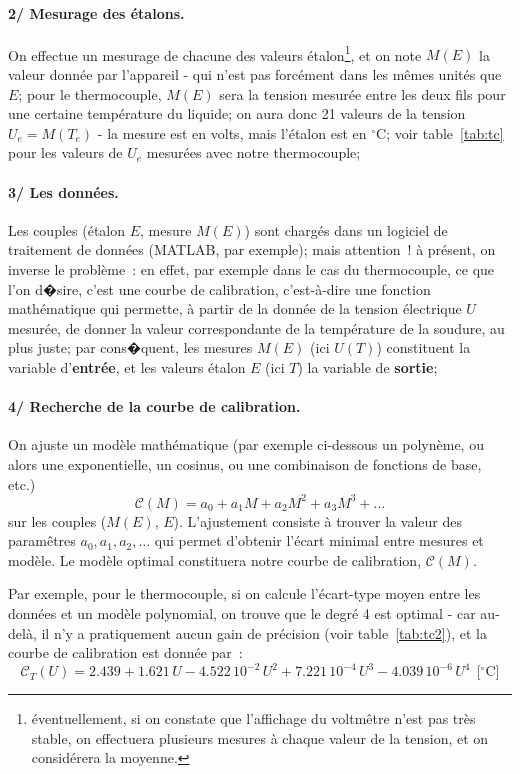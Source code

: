 \paragraph{2/ Mesurage des étalons.} On effectue un mesurage de chacune des valeurs étalon\footnote{éventuellement, si on constate que l'affichage du voltmêtre n'est pas très stable, on effectuera plusieurs mesures à chaque valeur de la tension, et on considérera la moyenne.}, et on note $M(E)$ la valeur donnée par l'appareil - qui n'est pas forcément dans les mêmes unités que $E$; pour le thermocouple, $M(E)$ sera la tension mesurée entre les deux fils pour une certaine température du liquide; on aura donc 21 valeurs de la tension $U_e=M(T_e)$ - la mesure est en volts, mais l'étalon est en $^\circ$C; voir table~\ref{tab:tc} pour les valeurs de $U_e$ mesurées avec notre thermocouple;

\paragraph{3/ Les données.} Les couples (étalon $E$, mesure $M(E)$) sont chargés dans un logiciel de traitement de données (MATLAB, par exemple); mais attention~! à présent, on inverse le problème~: en effet, par exemple dans le cas du thermocouple, ce que l'on d�sire, c'est une courbe de calibration, c'est-à-dire une fonction mathématique qui permette, à partir de la donnée de la tension électrique $U$ mesurée, de donner la valeur correspondante de la température de la soudure, au plus juste; par cons�quent, les mesures $M(E)$ (ici $U(T)$) constituent la variable d'\textbf{entrée}, et les valeurs étalon $E$ (ici $T$) la variable de \textbf{sortie};

\paragraph{4/ Recherche de la courbe de calibration.} On ajuste un modèle mathématique (par exemple ci-dessous un polynème, ou alors une exponentielle, un cosinus, ou une combinaison de fonctions de base, etc.) $$\mathcal{C}(M)=a_0+a_1M+a_2M^2+a_3M^3+\dots$$ sur les couples ($M(E)$, $E$). L'ajustement consiste à trouver la valeur des paramêtres $a_0, a_1, a_2,\dots$ qui permet d'obtenir l'écart minimal entre mesures et modèle. Le modèle optimal constituera notre courbe de calibration, $\mathcal{C}(M)$.

Par exemple, pour le thermocouple, si on calcule l'écart-type moyen entre les données et un modèle polynomial, on trouve que le degré 4 est optimal - car au-delà, il n'y a pratiquement aucun gain de précision (voir table~\ref{tab:tc2}), et la courbe de calibration est donnée par~:
\begin{equation*}
\mathcal{C}_T(U)=2.439+1.621\,U-4.522\,10^{-2}\,U^2+7.221\,10^{-4}\,U^3-4.039\,10^{-6}\,U^4\ \ \text{[$^\circ$C]}
\end{equation*}

